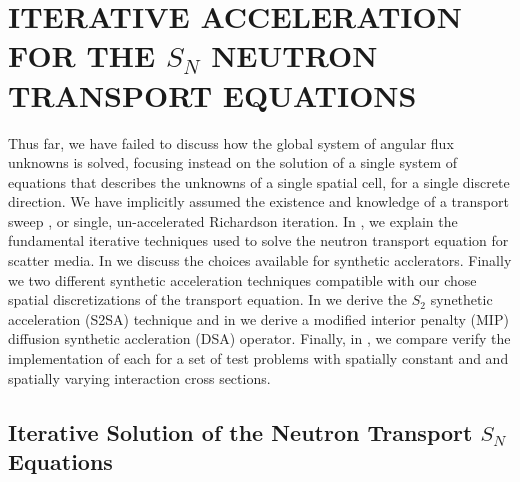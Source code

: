%
%
%



\chapter{\uppercase{Iterative Acceleration for the $S_N$ Neutron Transport Equations}}
\label{sec:chapter4_acceleration}

Thus far, we have failed to discuss how the global system of angular flux unknowns is solved, 
focusing instead on the solution of a single system of equations that describes the unknowns of a single spatial cell, for a single discrete direction.
We have implicitly assumed the existence and knowledge of a transport sweep \cite{lewis_book}, or single, un-accelerated Richardson iteration.
In , we explain the fundamental iterative techniques used to solve the neutron transport equation for scatter media.
In  we discuss the choices available for synthetic acclerators.
Finally  we two different synthetic acceleration techniques compatible with our chose spatial discretizations of the transport equation.
In  we derive the $S_2$ synethetic acceleration (S2SA) technique\cite{s2sa} and in  we derive a modified interior penalty (MIP) diffusion synthetic accleration\cite{mip_dsa} (DSA) operator.  Finally, in , we compare verify the implementation of each for a set of test problems with spatially constant and and spatially varying interaction cross sections.


\section{Iterative Solution of the Neutron Transport $S_N$ Equations}
\label{sec:dsa_basis}

